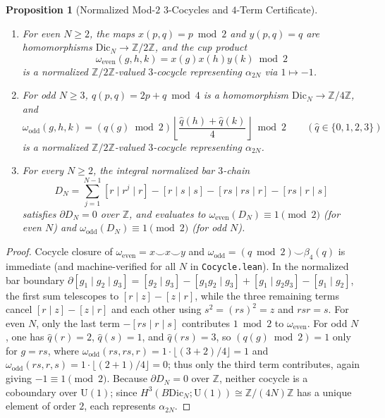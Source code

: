 \documentclass[11pt]{amsart}
\newtheorem{proposition}[theorem]{Proposition}
\theoremstyle{definition}
\theoremstyle{remark}
\newcommand{\Z}{\mathbb{Z}}
\newcommand{\U}{\mathrm{U}}
\newcommand{\Dic}{\mathrm{Dic}}
\begin{document}
\begin{proposition}[Normalized Mod-$2$ $3$-Cocycles and $4$-Term Certificate]\label{prop:cocycles}
\begin{enumerate}
    \item For even $N \ge 2$, the maps $x(p,q)=p\bmod 2$ and $y(p,q)=q$ are homomorphisms $\Dic_N \to \Z/2\Z$, and the cup product
    \[
        \omega_{\mathrm{even}}(g,h,k) = x(g)x(h)y(k) \bmod 2
    \]
    is a normalized $\Z/2\Z$-valued $3$-cocycle representing $\alpha_{2N}$ via $1 \mapsto -1$.
    \item For odd $N \ge 3$, $q(p,q) = 2p + q \bmod 4$ is a homomorphism $\Dic_N \to \Z/4\Z$, and
    \[
        \omega_{\mathrm{odd}}(g,h,k) = (q(g)\bmod 2)\left\lfloor \frac{\hat{q}(h)+\hat{q}(k)}{4}\right\rfloor \bmod 2 \qquad (\hat{q}\in\{0,1,2,3\})
    \]
    is a normalized $\Z/2\Z$-valued $3$-cocycle representing $\alpha_{2N}$.
    \item For every $N \ge 2$, the integral normalized bar $3$-chain
    \[
        D_N = \sum_{j=1}^{N-1}[r\mid r^j\mid r] - [r\mid s\mid s] - [rs\mid rs\mid r] - [rs\mid r\mid s]
    \]
    satisfies $\partial D_N = 0$ over $\Z$, and evaluates to $\omega_{\mathrm{even}}(D_N) \equiv 1 \pmod 2$ (for even $N$) and $\omega_{\mathrm{odd}}(D_N) \equiv 1 \pmod 2$ (for odd $N$).
\end{enumerate}
\end{proposition}
\begin{proof}
Cocycle closure of $\omega_{\mathrm{even}} = x \smile x \smile y$ and $\omega_{\mathrm{odd}} = (q\bmod 2) \smile \beta_4(q)$ is immediate (and machine-verified for all $N$ in \texttt{Cocycle.lean}).
In the normalized bar boundary $\partial[g_1\mid g_2\mid g_3]=[g_2\mid g_3]-[g_1g_2\mid g_3]+[g_1\mid g_2g_3]-[g_1\mid g_2]$, the first sum telescopes to $[r\mid z]-[z\mid r]$, while the three remaining terms cancel $[r\mid z]-[z\mid r]$ and each other using $s^2=(rs)^2=z$ and $rsr=s$.
For even $N$, only the last term $-[rs\mid r\mid s]$ contributes $1\bmod 2$ to $\omega_{\mathrm{even}}$. For odd $N$, one has $\hat{q}(r)=2$, $\hat{q}(s)=1$, and $\hat{q}(rs)=3$, so $(q(g)\bmod 2)=1$ only for $g=rs$, where $\omega_{\mathrm{odd}}(rs,rs,r)=1\cdot\lfloor(3+2)/4\rfloor=1$ and $\omega_{\mathrm{odd}}(rs,r,s)=1\cdot\lfloor(2+1)/4\rfloor=0$; thus only the third term contributes, again giving $-1\equiv 1\pmod 2$.
Because $\partial D_N = 0$ over $\Z$, neither cocycle is a coboundary over $\U(1)$; since $H^3(B\Dic_N;\U(1))\cong\Z/(4N)\Z$ has a unique element of order $2$, each represents $\alpha_{2N}$.
\end{proof}
\end{document}

